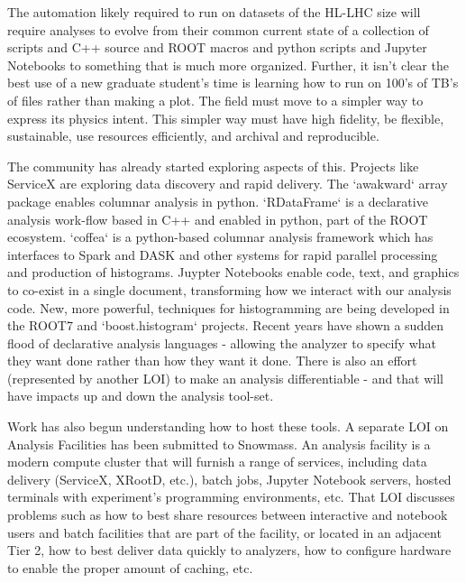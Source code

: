 \documentclass{article}
\begin{document}
The automation likely required to run on datasets of the HL-LHC size will require analyses to evolve from their common current state of a collection of scripts and C++ source and ROOT macros and python scripts and Jupyter Notebooks to something that is much more organized. Further, it isn't clear the best use of a new graduate student's time is learning how to run on 100's of TB's of files rather than making a plot. The field must move to a simpler way to express its physics intent. This simpler way must have high fidelity, be flexible, sustainable, use resources efficiently, and archival and reproducible.

The community has already started exploring aspects of this. Projects like ServiceX\cite{servicex} are exploring data discovery and rapid delivery. The `awakward` array package\cite{awkward} enables columnar analysis in python. `RDataFrame`\cite{rdataframe} is a declarative analysis work-flow based in C++ and enabled in python, part of the ROOT ecosystem. `coffea`\cite{coffea} is a python-based columnar analysis framework which has interfaces to Spark\cite{spark} and DASK\cite{dask} and other systems for rapid parallel processing and production of histograms. Juypter Notebooks enable code, text, and graphics to co-exist in a single document, transforming how we interact with our analysis code. New, more powerful, techniques for histogramming are being developed in the ROOT7 and `boost.histogram`\cite{boost} projects. Recent years have shown a sudden flood of declarative analysis languages - allowing the analyzer to specify what they want done rather than how they want it done. There is also an effort (represented by another LOI\cite{diff-prog-loi}) to make an analysis differentiable\cite{differentiable-programming} - and that will have impacts up and down the analysis tool-set.

Work has also begun understanding how to host these tools. A separate LOI on Analysis Facilities\cite{analysis-facilities-loi} has been submitted to Snowmass. An analysis facility is a modern compute cluster that will furnish a range of services, including data delivery (ServiceX, XRootD\cite{xrootd}, etc.), batch jobs, Jupyter Notebook servers, hosted terminals with experiment's programming environments, etc. That LOI discusses problems such as how to best share resources between interactive and notebook users and batch facilities that are part of the facility, or located in an adjacent Tier 2, how to best deliver data quickly to analyzers, how to configure hardware to enable the proper amount of caching, etc.
\end{document}
